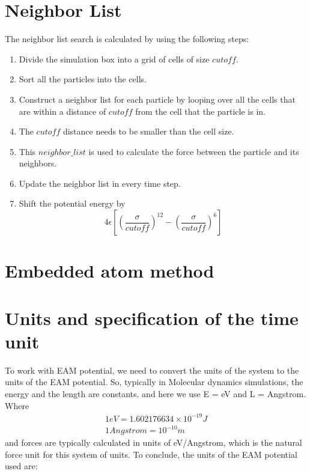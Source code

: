 \section{Neighbor List}
    The neighbor list search is calculated by using the following steps:
        \begin{enumerate}
            \item Divide the simulation box into a grid of cells of size $cutoff$.
            \item Sort all the particles into the cells.
            \item Construct a neighbor list for each particle by looping over all the cells that are within a distance of $cutoff$ from the cell that the particle is in.
            \item The $cutoff$ distance needs to be smaller than the cell size.
            \item This $neighbor\_list$ is used to calculate the force between the particle and its neighbors.
            \item Update the neighbor list in every time step.
            \item Shift the potential energy by
            \begin{equation}
                4 \epsilon [\left(\frac{\sigma}{cutoff}\right)^{12} - \left(\frac{\sigma}{cutoff}\right)^{6}]
            \end{equation}
        \end{enumerate}
\section{Embedded atom method}


\section{Units and specification of the time unit}
    To work with EAM potential, we need to convert the units of the system to the units of the EAM potential. So, typically in Molecular dynamics simulations, the energy and the length are constants. and here we use E = eV and L = Angstrom. Where
    \begin{equation}
    \label{eq:units}
        \begin{aligned}
            1 eV = 1.602176634 \times 10^{-19} J \\
            1 Angstrom = 10^{-10} m
        \end{aligned}
    \end{equation}
    and forces are typically calculated in units of eV/Angstrom, which is the natural force unit for this system of units.
    To conclude, the units of the EAM potential used are:

